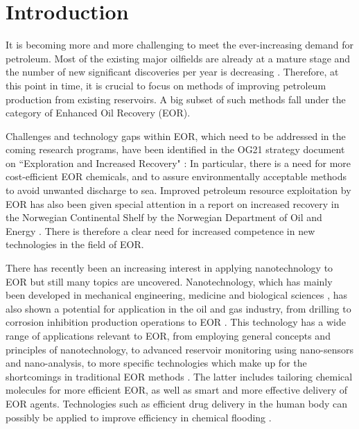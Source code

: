 \documentclass[energies,article,submit,moreauthors,pdftex]{Definitions/mdpi}
\begin{document}


\section{Introduction}
It is becoming more and more challenging to meet the ever-increasing demand for petroleum. Most of the existing major oilfields are already at a mature stage and the number of new significant discoveries per year is decreasing \cite{BP2018}. Therefore, at this point in time, it is crucial to focus on methods of improving petroleum production from existing reservoirs. A big subset of such methods fall under the category of Enhanced Oil Recovery (EOR).

Challenges and technology gaps within EOR, which need to be addressed in the coming research programs, have been identified in the OG21 strategy document on ``Exploration and Increased Recovery" \citep{OG21}: In particular, there is a need for more cost-efficient EOR chemicals, and to assure environmentally acceptable methods to avoid unwanted discharge to sea. Improved petroleum resource exploitation by EOR has also been given special attention in a report on increased recovery in the Norwegian Continental Shelf by the Norwegian Department of Oil and Energy \citep{Am2010}. There is therefore a clear need for increased competence in new technologies in the field of EOR. 

There has recently been an increasing interest in applying nanotechnology to EOR but still many topics are uncovered. Nanotechnology, which has mainly been developed in mechanical engineering, medicine and biological sciences \cite{Jain2007, Perret2016, Polat2017}, has also shown a potential for application in the oil and gas industry, from drilling \cite{Mohamadian2018, Krishnamoorti2015, Wasan2003, Esmaeili2011, Amanullah2011, VanZanten2010, Maserati2010, Hurnaus2015} to corrosion inhibition \cite{Murugesan2016, Jauhari2011} production operations \cite{Huang2008, Huang2015, Belcher2010, Habibi2011, Ogolo2012, Ahmadi2013} to EOR \cite{Li2013, Hendraningrat2014, Yu2010, Zargartalebi2015, Manan2015}. This technology has a wide range of applications relevant to EOR, from employing general concepts and principles of nanotechnology, to advanced reservoir monitoring using nano-sensors and nano-analysis, to more specific technologies which make up for the shortcomings in traditional EOR methods \citep{Fletcher2010, Ayatollahi2012, Cocuzza2011, Mo2014, Jia2019}. The latter includes tailoring chemical molecules for more efficient EOR, as well as smart and more effective delivery of EOR agents. Technologies such as efficient drug delivery in the human body can possibly be applied to improve efficiency in chemical flooding \cite{Cordova2008, Johnson2010}.
\end{document}

